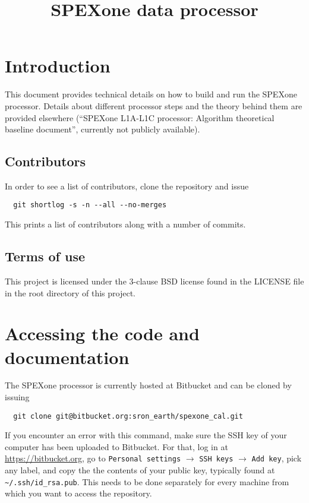 \documentclass{article}
\title{SPEXone data processor}
\date{\monthname {} \the\year}
\begin{document}
\maketitle
\tableofcontents

\section{Introduction}

This document provides technical details on how to build and run the SPEXone processor. Details about different processor steps and the theory behind them are provided elsewhere (``SPEXone L1A-L1C processor: Algorithm theoretical baseline document'', currently not publicly available).

\subsection{Contributors}

In order to see a list of contributors, clone the repository and issue
\begin{lstlisting}
  git shortlog -s -n --all --no-merges
\end{lstlisting}
This prints a list of contributors along with a number of commits.

\subsection{Terms of use}

This project is licensed under the 3-clause BSD license found in the LICENSE file in the root directory of this project.

\section{Accessing the code and documentation}

The SPEXone processor is currently hosted at Bitbucket and can be cloned by issuing
\begin{lstlisting}
  git clone git@bitbucket.org:sron_earth/spexone_cal.git
\end{lstlisting}
If you encounter an error with this command, make sure the SSH key of your computer has been uploaded to Bitbucket. For that, log in at \url{https://bitbucket.org}, go to \lstinline!Personal settings! $\rightarrow$ \lstinline!SSH keys! $\rightarrow$ \lstinline!Add key!, pick any label, and copy the the contents of your public key, typically found at \verb+~/.ssh/id_rsa.pub+. This needs to be done separately for every machine from which you want to access the repository.
\end{document}
